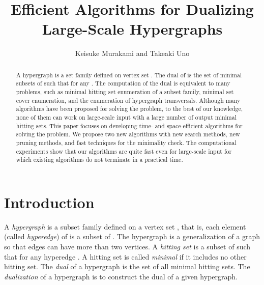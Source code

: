 
\newcommand{\mat}[1]{\mbox{\boldmath }}


\title{Efficient Algorithms for Dualizing Large-Scale Hypergraphs}
\author{Keisuke Murakami and Takeaki Uno}



\maketitle

\begin{abstract}

A hypergraph  is a set family defined on vertex set .
The dual of  is the set of minimal subsets  of  such that
  for any .
The computation of the dual is equivalent to many problems, such as
 minimal hitting set enumeration of a subset family, minimal set cover
 enumeration, and the enumeration of hypergraph transversals.
Although many algorithms have been proposed for solving the problem,
 to the best of our knowledge, none of them can work on
 large-scale input with a large number of output minimal hitting sets.
This paper focuses on developing time- and space-efficient algorithms
 for solving the problem.
We propose two new algorithms with new search methods, 
 new pruning methods, and fast techniques for the minimality check.
The computational experiments show that our algorithms are quite fast
 even for large-scale input for which existing algorithms do not
 terminate in a practical time.
\end{abstract}

\section{Introduction}

A {\em hypergraph}  is a subset family defined on a vertex set ,
 that is, each element (called {\em hyperedge})  of  is a subset
 of .
The hypergraph is a generalization of a graph so that edges can have more
 than two vertices.
A {\em hitting set} is a subset  of  such that 
 for any hyperedge .
 A hitting set is called {\em minimal} if it includes no other hitting set.
The {\em dual} of a hypergraph is the set of all minimal hitting sets.
The {\em dualization} of a hypergraph is to construct the dual of a
 given hypergraph.

